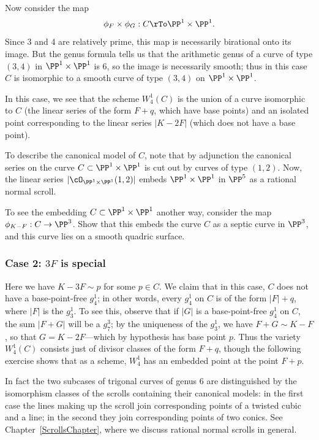 Now consider the map
$$
\phi_F \times \phi_G : C \rTo \PP^1 \times \PP^1.
$$
Since 3 and 4 are relatively prime, this map is necessarily birational onto its image. But the genus formula tells us that the arithmetic genus of a curve of type $(3,4)$ in $\PP^1 \times \PP^1$ is 6, so the image is necessarily smooth; thus in this case $C$ is isomorphic to a smooth curve of type $(3,4)$ on $\PP^1 \times \PP^1$.

In this case, we see that the scheme $W^1_4(C)$ is the union of a curve isomorphic to $C$ (the linear series of the form $F + q$, which have base points) and an isolated point corresponding to the linear series $|K - 2F|$ (which does not have a base point).

To describe the canonical model of $C$, note that by adjunction the canonical series on the curve $C \subset \PP^1 \times \PP^1$ is cut out by curves of type $(1,2)$. Now, the linear series $|\cO_{\PP^1 \times \PP^1}(1,2)|$ embeds $\PP^1 \times \PP^1$ in $\PP^5$ as a rational normal scroll.

\begin{exercise}
To see the embedding $C \subset \PP^1 \times \PP^1$ another way, consider the map $\phi_{K-F} : C \to \PP^3$. Show that this embeds the curve $C$ as a septic curve in $\PP^3$, and this curve lies on a smooth quadric surface.
\end{exercise}

\subsubsection{Case 2: $3F$ is special}  Here we have $K - 3F \sim p$ for some $p \in C$. We claim that in this case, $C$ does not have a base-point-free $g^1_4$; in other words, every $g^1_4$ on $C$ is of the form $|F| + q$, where $|F|$ is the $g^1_3$. To see this, observe that if $|G|$ is a base-point-free $g^1_4$ on $C$, the sum $|F+G|$ will be a $g^3_7$; by the uniqueness of the $g^1_3$, we have $F+G \sim K - F$, so that $G = K-2F$---which by hypothesis has base point $p$. Thus the variety $W^1_4(C)$ consists just of divisor classes of the form $F+q$, though the following exercise shows that as a scheme, $W^1_4$ has an embedded point at the point $F+p$.

In fact  the two subcases of trigonal curves of genus 6 are distinguished by the isomorphism classes of the scrolls containing their canonical models: in the first case the lines making up the scroll join corresponding points of a twisted
cubic and a line; in the second they join corresponding points of two conics.
See Chapter~\ref{ScrollsChapter}, where we discuss rational normal scrolls in general.

